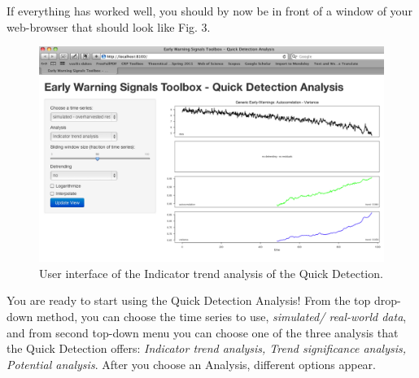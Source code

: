 \documentclass[12pt,a4paper,final]{article}
\begin{document}
\begin{doublespacing}
If everything has worked well, you should by now be in front of a window of your web-browser that should look like Fig. 3.

\begin{figure}[ht]
\includegraphics[scale=0.4]{demo_start.png}
\caption{User interface of the Indicator trend analysis of the Quick Detection.}
\end{figure}

You are ready to start using the Quick Detection Analysis! From the top drop-down method, you can choose the time series to use, \textit{simulated/ real-world data}, and from second top-down menu you can choose one of the three analysis that the Quick Detection offers: \textit{Indicator trend analysis, Trend significance analysis, Potential analysis}. After you choose an Analysis, different options appear.


\end{doublespacing}
\end{document}
